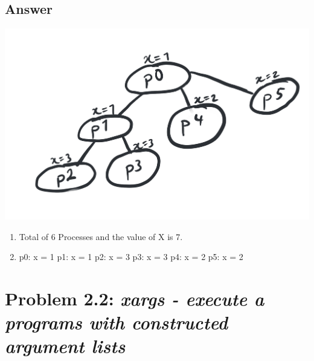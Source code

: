 \documentclass[
	12pt, %
]{fphw}
\begin{document}
\subsection*{Answer}
\begin{center}\includegraphics[width=0.7\columnwidth]{process tree.jpg}\end{center}
\begin{enumerate}
	\item Total of 6 Processes and the value of X is 7.
	\item p0: x = 1 \newline p1: x = 1 \newline p2: x = 3 \newline p3: x = 3 \newline p4: x = 2 \newline p5: x = 2
\end{enumerate}



\section*{Problem 2.2: \emph{xargs - execute a programs with constructed argument lists}}
\end{document}
